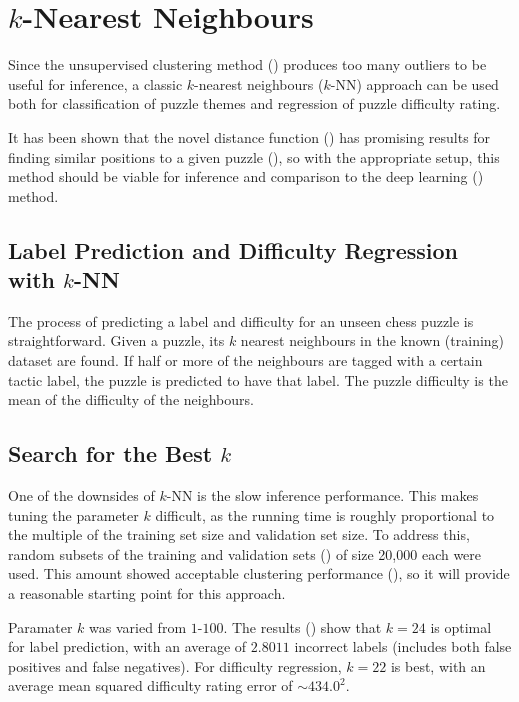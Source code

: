 \pagebreak

\section{$k$-Nearest Neighbours}\label{treeS3}

Since the unsupervised clustering method () produces too many
outliers to be useful for inference, a classic $k$-nearest neighbours ($k$-NN)
approach \citep{fix1985discriminatory} can be used both for classification of
puzzle themes and regression of puzzle difficulty rating.

It has been shown that the novel distance function () has
promising results for finding similar positions to a given puzzle
(), so with the appropriate setup, this method should be viable
for inference and comparison to the deep learning () method.

\subsection{Label Prediction and Difficulty Regression with $k$-NN}

The process of predicting a label and difficulty for an unseen chess puzzle is
straightforward. Given a puzzle, its $k$ nearest neighbours in the known
(training) dataset are found. If half or more of the neighbours are tagged with
a certain tactic label, the puzzle is predicted to have that label. The puzzle
difficulty is the mean of the difficulty of the neighbours.

\subsection{Search for the Best $k$}\label{treeS31}

One of the downsides of $k$-NN is the slow inference performance. This makes
tuning the parameter $k$ difficult, as the running time is roughly proportional
to the multiple of the training set size and validation set size. To address
this, random subsets of the training and validation sets () of size
20,000 each were used. This amount showed acceptable clustering performance
(), so it will provide a reasonable starting point for this
approach.

Paramater $k$ was varied from $1$-$100$. The results () show that
$k=24$ is optimal for label prediction, with an average of $2.8011$ incorrect
labels (includes both false positives and false negatives). For difficulty
regression, $k=22$ is best, with an average mean squared difficulty rating
error of $\sim\!434.0^2$. 

